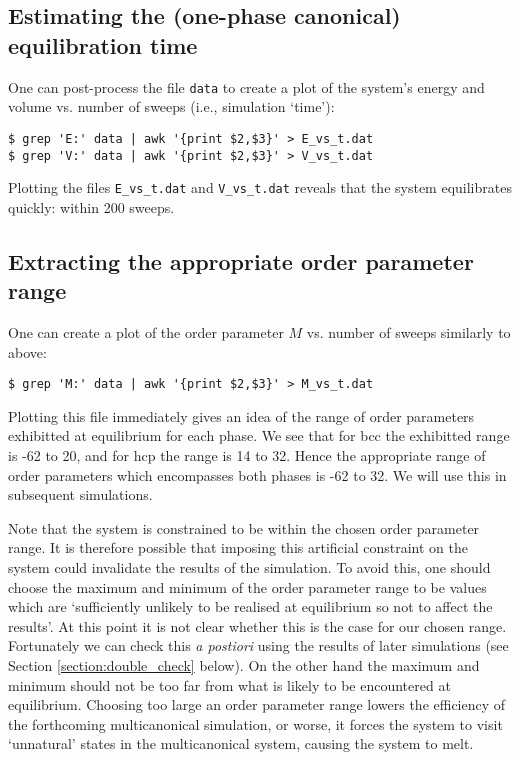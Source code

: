 \documentclass{report}
\begin{document}
\subsection{Estimating the (one-phase canonical) equilibration time}
One can post-process the file \texttt{data} to create a plot of the system's energy and volume vs. number of sweeps (i.e., simulation `time'):
\begin{verbatim}
$ grep 'E:' data | awk '{print $2,$3}' > E_vs_t.dat
$ grep 'V:' data | awk '{print $2,$3}' > V_vs_t.dat
\end{verbatim}
Plotting the files \texttt{E\_vs\_t.dat} and \texttt{V\_vs\_t.dat} reveals that the system equilibrates quickly: within 200 sweeps.

\subsection{Extracting the appropriate order parameter range}
One can create a plot of the order parameter $M$ vs. number of sweeps similarly to above:
\begin{verbatim}
$ grep 'M:' data | awk '{print $2,$3}' > M_vs_t.dat
\end{verbatim}
Plotting this file immediately gives an idea of the range of order parameters exhibitted at equilibrium for each phase. We see that for
bcc the exhibitted range is -62 to 20, and for hcp the range is 14 to 32. Hence the appropriate range of order parameters which encompasses
both phases is -62 to 32. We will use this in subsequent simulations.

Note that the system is constrained to be within the chosen order parameter range. It is therefore possible that imposing this artificial
constraint on the system could invalidate the results of the simulation. To avoid this, one should choose the maximum and minimum of the order
parameter range to be values which are `sufficiently unlikely to be realised at equilibrium so not to affect the results'. At this point it is
not clear whether this is the case for our chosen range. Fortunately we can check this \emph{a postiori} using the results of later simulations 
(see Section \ref{section:double_check} below). On the other hand the maximum and minimum should not be too far from what is likely to be 
encountered at equilibrium. 
Choosing too large an order parameter range lowers the efficiency of the forthcoming multicanonical simulation, or worse, it forces the system to 
visit `unnatural' states in the multicanonical system, causing the system to melt.
\end{document}

